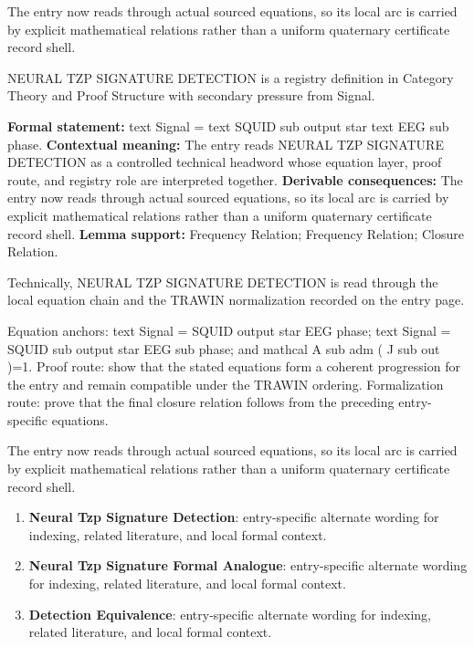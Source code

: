 The entry now reads through actual sourced equations, so its local arc is carried by explicit mathematical relations rather than a uniform quaternary certificate record shell.
\clearpage


\begingroup\small
{}
NEURAL TZP SIGNATURE DETECTION is a registry definition in Category Theory and Proof Structure with secondary pressure from Signal.

\begingroup\footnotesize\setlength{\emergencystretch}{3em}\sloppy
\textbf{Formal statement:} text Signal = text SQUID sub output star text EEG sub phase. \textbf{Contextual meaning:} The entry reads NEURAL TZP SIGNATURE DETECTION as a controlled technical headword whose equation layer, proof route, and registry role are interpreted together. \textbf{Derivable consequences:} The entry now reads through actual sourced equations, so its local arc is carried by explicit mathematical relations rather than a uniform quaternary certificate record shell. \textbf{Lemma support:} Frequency Relation; Frequency Relation; Closure Relation.\par
\endgroup

Technically, NEURAL TZP SIGNATURE DETECTION is read through the local equation chain and the TRAWIN normalization recorded on the entry page.

Equation anchors: text Signal = SQUID output star EEG phase; text Signal = SQUID sub output star EEG sub phase; and mathcal A sub adm ( J sub out )=1. Proof route: show that the stated equations form a coherent progression for the entry and remain compatible under the TRAWIN ordering. Formalization route: prove that the final closure relation follows from the preceding entry-specific equations.

The entry now reads through actual sourced equations, so its local arc is carried by explicit mathematical relations rather than a uniform quaternary certificate record shell.
\endgroup

\begin{enumerate}[leftmargin=1.6em,itemsep=6pt,topsep=4pt]
\item \textbf{Neural Tzp Signature Detection}: entry-specific alternate wording for indexing, related literature, and local formal context.
\item \textbf{Neural Tzp Signature Formal Analogue}: entry-specific alternate wording for indexing, related literature, and local formal context.
\item \textbf{Detection Equivalence}: entry-specific alternate wording for indexing, related literature, and local formal context.
\end{enumerate}

